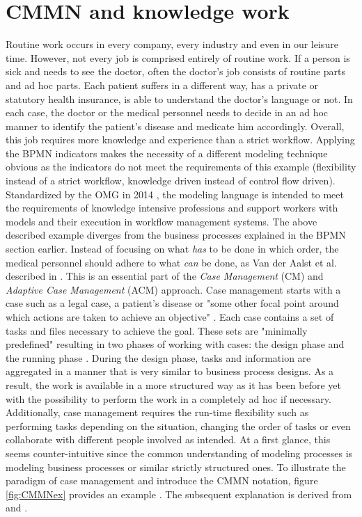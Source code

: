 \section{CMMN and knowledge work}
Routine work occurs in every company, every industry and even in our leisure time. However, not every job is comprised entirely of routine work. If a person is sick and needs to see the doctor, often the doctor's job consists of routine parts and ad hoc parts. Each patient suffers in a different way, has a private or statutory health insurance, is able to understand the doctor's language or not. In each case, the doctor or the medical personnel needs to decide in an ad hoc manner to identify the patient's disease and medicate him accordingly. Overall, this job requires more knowledge and experience than a strict workflow. Applying the BPMN indicators makes the necessity of a different modeling technique obvious as the indicators do not meet the requirements of this example (flexibility instead of a strict workflow, knowledge driven instead of control flow driven).
Standardized by the OMG in 2014 \cite{CMMNspec2014}, the modeling language is intended to meet the requirements of knowledge intensive professions and support workers with models and their execution in workflow management systems. 
The above described example diverges from the business processes explained in the BPMN section earlier. Instead of focusing on what \textit{has} to be done in which order, the medical personnel should adhere to what \textit{can} be done, as Van der Aalst et al. described in \cite{aalst2005}. This is an essential part of the \textit{Case Management} (CM) and \textit{Adaptive Case Management} (ACM) approach. Case management starts with a case such as a legal case, a patient's disease or "some other focal point around which actions are taken to achieve an objective" \cite{CMMNspec2014}. Each case contains a set of tasks and files necessary to achieve the goal. These sets are "minimally predefined" \cite{CMMNspec2014} resulting in two phases of working with cases: the design phase and the running phase \cite{CMMNspec2014}. During the design phase, tasks and information are aggregated in a manner that is very similar to business process designs. As a result, the work is available in a more structured way as it has been before yet with the possibility to perform the work in a completely ad hoc if necessary. Additionally, case management requires the run-time flexibility such as performing tasks depending on the situation, changing the order of tasks or even collaborate with different people involved as intended. 
At a first glance, this seems counter-intuitive since the common understanding of modeling processes is modeling business processes or similar strictly structured ones. To illustrate the paradigm of case management and introduce the CMMN notation, figure \ref{fig:CMMNex} provides an example . The subsequent explanation is derived from \cite{CMMNspec2014} and \cite{hinkelmann2015}.

